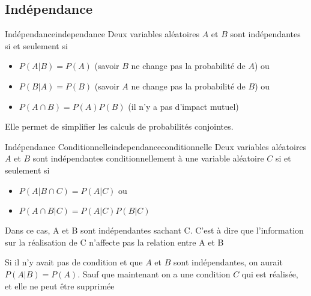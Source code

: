 \subsection{Indépendance} %
\label{sub:independance}


\begin{definition}{Indépendance}{independance}
    Deux variables aléatoires $A$ et $B$ sont indépendantes si et seulement si 
    \begin{itemize}[label=\textbullet]
        \item $P(A | B) = P(A)$  (savoir $B$ ne change pas la probabilité de $A$) ou
        \item $P(B | A) = P(B)$ (savoir $A$ ne change pas la probabilité de $B$) ou
        \item $P(A \cap B) = P(A)P(B)$ (il n'y a pas d'impact mutuel)
    \end{itemize}
    Elle permet de simplifier les calculs de probabilités conjointes.
\end{definition}

\begin{definition}{Indépendance Conditionnelle}{independanceconditionnelle}
    Deux variables aléatoires $A$ et $B$ sont indépendantes conditionnellement à une variable aléatoire $C$ si et seulement si 
    \begin{itemize}
        \item $P(A | B \cap C) = P(A | C)$ ou 
        \item $P(A \cap B | C) = P(A | C)P(B | C)$
    \end{itemize}
    Dans ce cas, A et B sont indépendantes sachant C. C'est à dire que l'information sur la réalisation de C n'affecte pas la relation entre A et B
\end{definition}
\begin{remark}\leavevmode
    Si il n'y avait pas de condition et que $A$ et $B$ sont indépendantes, 
    on aurait $P(A | B) = P(A)$. Sauf que maintenant on a une condition $C$ qui est réalisée, et elle ne peut être supprimée
\end{remark}

